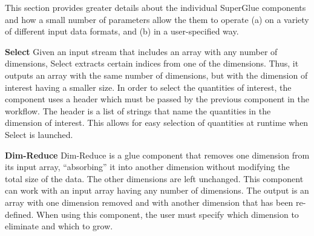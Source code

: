 \documentclass[conference]{IEEEtran}
\begin{document}

This section provides greater details about the individual SuperGlue components
and how a small number of
parameters allow the them to operate (a) on a variety
of different input data formats, and (b) in
a user-specified way.

\textbf{Select}
Given an input stream that includes an array with any number of dimensions,
Select extracts certain indices from one of the dimensions. Thus, it outputs an
array with the same number of dimensions, but with the dimension of interest
having a smaller size. In order to select the quantities of interest, the
component uses a header which must be passed by the previous component in the
workflow. The header is a list of strings that name the quantities in the
dimension of interest. This allows for easy selection of quantities at runtime
when Select is launched.

\textbf{Dim-Reduce}
Dim-Reduce is a glue component that removes one dimension from its
input array, ``absorbing'' it into another dimension without modifying the
total size of the data. The other dimensions are left unchanged. This component
can work with an input array having any number of dimensions. The output is an
array with one dimension removed and with another dimension that has been
re-defined. When using this component, the user must specify which
dimension to eliminate and which to grow.
\end{document}

